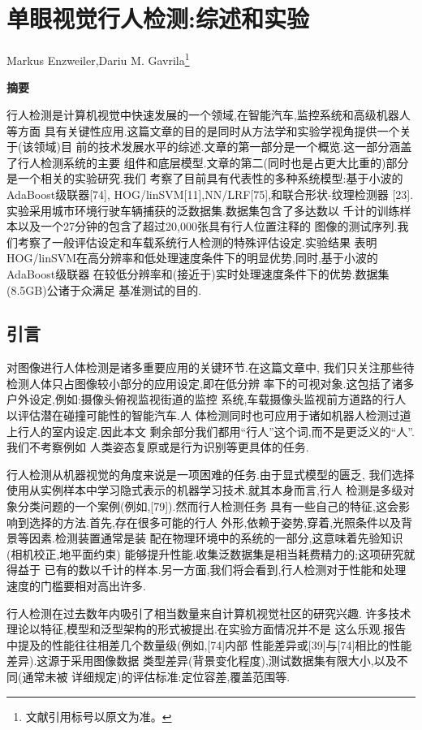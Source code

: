 \chapter{单眼视觉行人检测:综述和实验}
\begin{center}
    Markus Enzweiler,Dariu M. Gavrila\footnote{文献引用标号以原文为准。}
\end{center}
\begin{center}
    \textbf{摘要}
\end{center}

行人检测是计算机视觉中快速发展的一个领域,在智能汽车,监控系统和高级机器人等方面
具有关键性应用.这篇文章的目的是同时从方法学和实验学视角提供一个关于(该领域)目   
前的技术发展水平的综述.文章的第一部分是一个概览.这一部分涵盖了行人检测系统的主要
组件和底层模型.文章的第二(同时也是占更大比重的)部分是一个相关的实验研究.我们
考察了目前具有代表性的多种系统模型:基于小波的AdaBoost级联器[74],
HOG/linSVM[11],NN/LRF[75],和联合形状-纹理检测器
[23].实验采用城市环境行驶车辆捕获的泛数据集.数据集包含了多达数以
千计的训练样本以及一个27分钟的包含了超过20,000张具有行人位置注释的
图像的测试序列.我们考察了一般评估设定和车载系统行人检测的特殊评估设定.实验结果
表明HOG/linSVM在高分辨率和低处理速度条件下的明显优势,同时,基于小波的AdaBoost级联器
在较低分辨率和(接近于)实时处理速度条件下的优势.数据集(8.5GB)公诸于众满足
基准测试的目的.
\section{引言}
对图像进行人体检测是诸多重要应用的关键环节.在这篇文章中,
我们只关注那些待检测人体只占图像较小部分的应用设定,即在低分辨
率下的可视对象.这包括了诸多户外设定,例如:摄像头俯视监视街道的监控
系统,车载摄像头监视前方道路的行人以评估潜在碰撞可能性的智能汽车.人
体检测同时也可应用于诸如机器人检测过道上行人的室内设定.因此本文
剩余部分我们都用``行人''这个词,而不是更泛义的``人''.我们不考察例如
人类姿态复原或是行为识别等更具体的任务.

行人检测从机器视觉的角度来说是一项困难的任务.由于显式模型的匮乏,
我们选择使用从实例样本中学习隐式表示的机器学习技术.就其本身而言,行人
检测是多级对象分类问题的一个案例(例如,[79]).然而行人检测任务
具有一些自己的特征,这会影响到选择的方法.首先,存在很多可能的行人
外形,依赖于姿势,穿着,光照条件以及背景等因素.检测装置通常是装
配在物理环境中的系统的一部分,这意味着先验知识(相机校正,地平面约束)
能够提升性能.收集泛数据集是相当耗费精力的;这项研究就得益于
已有的数以千计的样本.另一方面,我们将会看到,行人检测对于性能和处理
速度的门槛要相对高出许多.

行人检测在过去数年内吸引了相当数量来自计算机视觉社区的研究兴趣.
许多技术理论以特征,模型和泛型架构的形式被提出.在实验方面情况并不是
这么乐观.报告中提及的性能往往相差几个数量级(例如,[74]内部
性能差异或[39]与[74]相比的性能差异).这源于采用图像数据
类型差异(背景变化程度),测试数据集有限大小,以及不同(通常未被
详细规定)的评估标准:定位容差,覆盖范围等.

